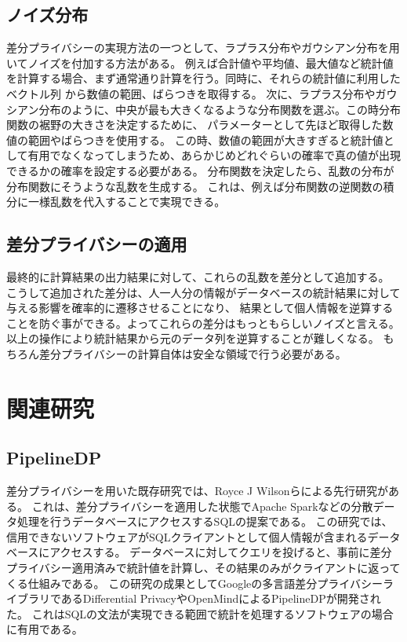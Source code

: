 \documentclass[a4paper,11pt]{jreport}
\begin{document}
\subsection{ノイズ分布}
差分プライバシーの実現方法の一つとして、ラプラス分布やガウシアン分布を用いてノイズを付加する方法がある。
例えば合計値や平均値、最大値など統計値を計算する場合、まず通常通り計算を行う。同時に、それらの統計値に利用したベクトル列
から数値の範囲、ばらつきを取得する。
次に、ラプラス分布やガウシアン分布のように、中央が最も大きくなるような分布関数を選ぶ。この時分布関数の裾野の大きさを決定するために、
パラメーターとして先ほど取得した数値の範囲やばらつきを使用する。
この時、数値の範囲が大きすぎると統計値として有用でなくなってしまうため、あらかじめどれぐらいの確率で真の値が出現できるかの確率を設定する必要がある。
分布関数を決定したら、乱数の分布が分布関数にそうような乱数を生成する。
これは、例えば分布関数の逆関数の積分に一様乱数を代入することで実現できる。\cite{rand}

\subsection{差分プライバシーの適用}
最終的に計算結果の出力結果に対して、これらの乱数を差分として追加する。
こうして追加された差分は、人一人分の情報がデータベースの統計結果に対して与える影響を確率的に遷移させることになり、
結果として個人情報を逆算することを防ぐ事ができる。よってこれらの差分はもっともらしいノイズと言える。
以上の操作により統計結果から元のデータ列を逆算することが難しくなる。
もちろん差分プライバシーの計算自体は安全な領域で行う必要がある。

\section{関連研究}

\subsection{PipelineDP}

差分プライバシーを用いた既存研究では、Royce J Wilsonらによる先行研究\cite{dpsql}がある。
これは、差分プライバシーを適用した状態でApache Spark\cite{apache}などの分散データ処理を行うデータベースにアクセスするSQLの提案である。
この研究では、信用できないソフトウェアがSQLクライアントとして個人情報が含まれるデータベースにアクセスする。
データベースに対してクエリを投げると、事前に差分プライバシー適用済みで統計値を計算し、その結果のみがクライアントに返ってくる仕組みである。
この研究の成果としてGoogleの多言語差分プライバシーライブラリであるDifferential Privacy\cite{googledp}やOpenMindによるPipelineDP\cite{openmind}が開発された。
これはSQLの文法が実現できる範囲で統計を処理するソフトウェアの場合に有用である。
\end{document}
